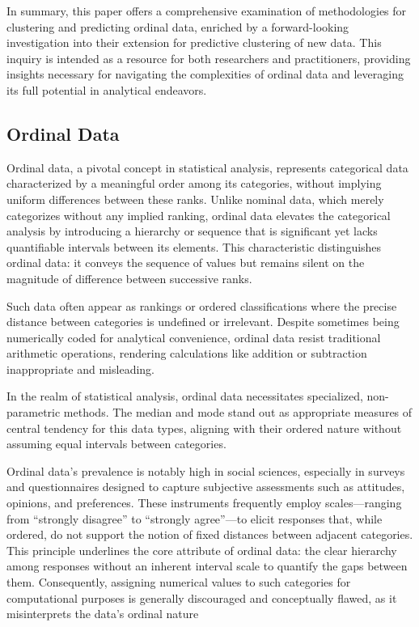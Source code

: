\documentclass{article}
\begin{document}
In summary, this paper offers a comprehensive examination of methodologies for clustering and predicting ordinal data, enriched by a forward-looking investigation into their extension for predictive clustering of new data. This inquiry is intended as a resource for both researchers and practitioners, providing insights necessary for navigating the complexities of ordinal data and leveraging its full potential in analytical endeavors.

\subsection*{Ordinal Data}

Ordinal data, a pivotal concept in statistical analysis, represents categorical data characterized by a meaningful order among its categories, without implying uniform differences between these ranks. Unlike nominal data, which merely categorizes without any implied ranking, ordinal data elevates the categorical analysis by introducing a hierarchy or sequence that is significant yet lacks quantifiable intervals between its elements. This characteristic distinguishes ordinal data: it conveys the sequence of values but remains silent on the magnitude of difference between successive ranks.

Such data often appear as rankings or ordered classifications where the precise distance between categories is undefined or irrelevant. 
Despite sometimes being numerically coded for analytical convenience, ordinal data resist traditional arithmetic operations, rendering calculations like addition or subtraction inappropriate and misleading.

In the realm of statistical analysis, ordinal data necessitates specialized, non-parametric methods. 
The median and mode stand out as appropriate measures of central tendency for this data types, 
aligning with their ordered nature without assuming equal intervals between categories.

Ordinal data's prevalence is notably high in social sciences, especially in surveys and questionnaires designed to capture subjective assessments such as attitudes, opinions, and preferences. These instruments frequently employ scales—ranging from ``strongly disagree'' to ``strongly agree''—to elicit responses that, while ordered, do not support the notion of fixed distances between adjacent categories. This principle underlines the core attribute of ordinal data: the clear hierarchy among responses without an inherent interval scale to quantify the gaps between them. Consequently, assigning numerical values to such categories for computational purposes is generally discouraged and conceptually flawed, as it misinterprets the data's ordinal nature 
\end{document}
